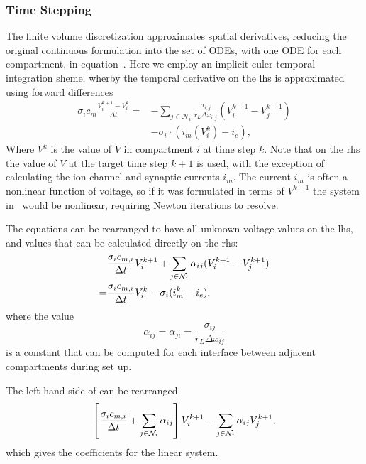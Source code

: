 \subsubsection{Time Stepping}
The finite volume discretization approximates spatial derivatives, reducing the original continuous formulation into the set of ODEs, with one ODE for each compartment, in equation~.
Here we employ an implicit euler temporal integration sheme, wherby the temporal derivative on the lhs is approximated using forward differences
\begin{align}
    \sigma_i c_m \frac{V_i^{k+1}-V_i^{k}}{\Delta t}
        = & -\sum_{j\in\mathcal{N}_i} {\frac{\sigma_{i,j}}{r_L \Delta x_{i,j}} (V_i^{k+1}-V_j^{k+1})} \nonumber \\
          & - \sigma_i\cdot(i_m(V_i^{k}) - i_e),
    \label{eq:ode_subs}
\end{align}
Where $V^k$ is the value of $V$ in compartment $i$ at time step $k$.
Note that on the rhs the value of $V$ at the target time step $k+1$ is used, with the exception of calculating the ion channel and synaptic currents $i_m$.
The current $i_m$ is often a nonlinear function of voltage, so if it was formulated in terms of $V^{k+1}$ the system in~ would be nonlinear, requiring Newton iterations to resolve.

The equations can be rearranged to have all unknown voltage values on the lhs, and values that can be calculated directly on the rhs:
\begin{align}
    & \frac{\sigma_i c_{m,i}}{\Delta t} V_i^{k+1} + \sum_{j\in\mathcal{N}_i} {\alpha_{ij} (V_i^{k+1}-V_j^{k+1})}
            \nonumber \\
    = & \frac{\sigma_i c_{m,i}}{\Delta t} V_i^k -  \sigma_i(i_m^{k} - i_e),
    \label{eq:ode_linsys}
\end{align}
where the value
\begin{equation}
    \alpha_{ij} = \alpha_{ji} = \frac{\sigma_{ij}}{ r_L \Delta x_{ij}}
    \label{eq:alpha_linsys}
\end{equation}
is a constant that can be computed for each interface between adjacent compartments during set up.

The left hand side of  can be rearranged
\begin{equation}
    \left[ \frac{\sigma_i c_{m,i}}{\Delta t} + \sum_{j\in\mathcal{N}_i} {\alpha_{ij}} \right] V_i^{k+1}
    - \sum_{j\in\mathcal{N}_i} { \alpha_{ij} V_j^{k+1}},
    \label{eq:rhs_linsys}
\end{equation}
which gives the coefficients for the linear system.

